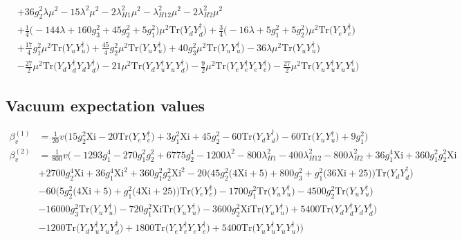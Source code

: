 {\begin{align}
 &+36 g_{2}^{2} \lambda \mu^2 -15 \lambda^{2} \mu^2 -2 \lambda_{H1}^{2} \mu^2 - \lambda_{H12}^{2} \mu^2 -2 \lambda_{H2}^{2} \mu^2 \nonumber \\ 
 &+\frac{1}{4} \Big(-144 \lambda  + 160 g_{3}^{2}  + 45 g_{2}^{2}  + 5 g_{1}^{2} \Big)\mu^2 \mbox{Tr}\Big({Y_d  Y_{d}^{\dagger}}\Big) +\frac{3}{4} \Big(-16 \lambda  + 5 g_{1}^{2}  + 5 g_{2}^{2} \Big)\mu^2 \mbox{Tr}\Big({Y_e  Y_{e}^{\dagger}}\Big) \nonumber \\ 
 &+\frac{17}{4} g_{1}^{2} \mu^2 \mbox{Tr}\Big({Y_u  Y_{u}^{\dagger}}\Big) +\frac{45}{4} g_{2}^{2} \mu^2 \mbox{Tr}\Big({Y_u  Y_{u}^{\dagger}}\Big) +40 g_{3}^{2} \mu^2 \mbox{Tr}\Big({Y_u  Y_{u}^{\dagger}}\Big) -36 \lambda \mu^2 \mbox{Tr}\Big({Y_u  Y_{u}^{\dagger}}\Big) \nonumber \\ 
 &-\frac{27}{2} \mu^2 \mbox{Tr}\Big({Y_d  Y_{d}^{\dagger}  Y_d  Y_{d}^{\dagger}}\Big) -21 \mu^2 \mbox{Tr}\Big({Y_d  Y_{u}^{\dagger}  Y_u  Y_{d}^{\dagger}}\Big) -\frac{9}{2} \mu^2 \mbox{Tr}\Big({Y_e  Y_{e}^{\dagger}  Y_e  Y_{e}^{\dagger}}\Big) -\frac{27}{2} \mu^2 \mbox{Tr}\Big({Y_u  Y_{u}^{\dagger}  Y_u  Y_{u}^{\dagger}}\Big) 
\end{align}} 
\subsection{Vacuum expectation values}
{\allowdisplaybreaks  \begin{align} 
\beta_{v}^{(1)} & =  
\frac{1}{20} v \Big(15 g_{2}^{2} \text{Xi}  -20 \mbox{Tr}\Big({Y_e  Y_{e}^{\dagger}}\Big)  + 3 g_{1}^{2} \text{Xi}  + 45 g_{2}^{2}  -60 \mbox{Tr}\Big({Y_d  Y_{d}^{\dagger}}\Big)  -60 \mbox{Tr}\Big({Y_u  Y_{u}^{\dagger}}\Big)  + 9 g_{1}^{2} \Big)\\ 
\beta_{v}^{(2)} & =  
\frac{1}{800} v \Big(-1293 g_{1}^{4} -270 g_{1}^{2} g_{2}^{2} +6775 g_{2}^{4} -1200 \lambda^{2} -800 \lambda_{H1}^{2} -400 \lambda_{H12}^{2} -800 \lambda_{H2}^{2} +36 g_{1}^{4} \text{Xi} +360 g_{1}^{2} g_{2}^{2} \text{Xi} \nonumber \\ 
 &+2700 g_{2}^{4} \text{Xi} +36 g_{1}^{4} \text{Xi}^{2} +360 g_{1}^{2} g_{2}^{2} \text{Xi}^{2} -20 \Big(45 g_{2}^{2} \Big(4 \text{Xi}  + 5\Big) + 800 g_{3}^{2}  + g_{1}^{2} \Big(36 \text{Xi}  + 25\Big)\Big)\mbox{Tr}\Big({Y_d  Y_{d}^{\dagger}}\Big) \nonumber \\ 
 &-60 \Big(5 g_{2}^{2} \Big(4 \text{Xi}  + 5\Big) + g_{1}^{2} \Big(4 \text{Xi}  + 25\Big)\Big)\mbox{Tr}\Big({Y_e  Y_{e}^{\dagger}}\Big) -1700 g_{1}^{2} \mbox{Tr}\Big({Y_u  Y_{u}^{\dagger}}\Big) -4500 g_{2}^{2} \mbox{Tr}\Big({Y_u  Y_{u}^{\dagger}}\Big) \nonumber \\ 
 &-16000 g_{3}^{2} \mbox{Tr}\Big({Y_u  Y_{u}^{\dagger}}\Big) -720 g_{1}^{2} \text{Xi} \mbox{Tr}\Big({Y_u  Y_{u}^{\dagger}}\Big) -3600 g_{2}^{2} \text{Xi} \mbox{Tr}\Big({Y_u  Y_{u}^{\dagger}}\Big) +5400 \mbox{Tr}\Big({Y_d  Y_{d}^{\dagger}  Y_d  Y_{d}^{\dagger}}\Big) \nonumber \\ 
 &-1200 \mbox{Tr}\Big({Y_d  Y_{u}^{\dagger}  Y_u  Y_{d}^{\dagger}}\Big) +1800 \mbox{Tr}\Big({Y_e  Y_{e}^{\dagger}  Y_e  Y_{e}^{\dagger}}\Big) +5400 \mbox{Tr}\Big({Y_u  Y_{u}^{\dagger}  Y_u  Y_{u}^{\dagger}}\Big) \Big)
\end{align}} 
